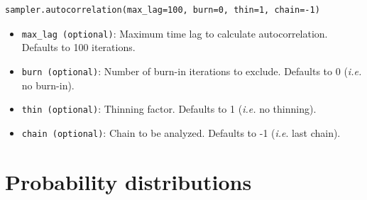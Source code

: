 \documentclass[]{book}
\begin{document}
\begin{verbatim}
sampler.autocorrelation(max_lag=100, burn=0, thin=1, chain=-1)
\end{verbatim}

\begin{itemize}

\item \verb=max_lag (optional)=: Maximum time lag to calculate autocorrelation. Defaults to 100 iterations.

\item \verb=burn (optional)=: Number of burn-in iterations to exclude. Defaults to 0 (\emph{i.e.} no burn-in).

\item \verb=thin (optional)=: Thinning factor. Defaults to 1 (\emph{i.e.} no thinning).

\item \verb=chain (optional)=: Chain to be analyzed. Defaults to -1 (\emph{i.e}. last chain).
\end{itemize}






\appendix

\chapter{Probability distributions}
\end{document}
